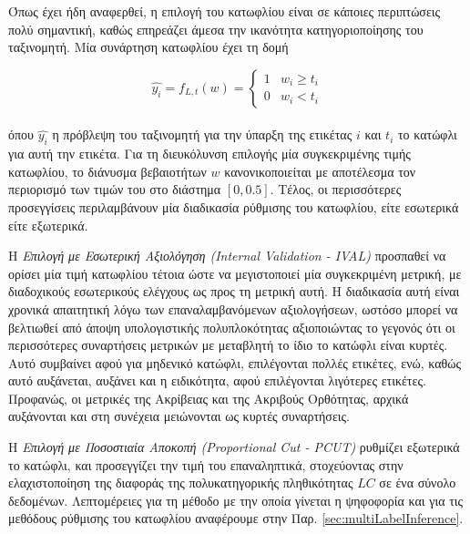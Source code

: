 Όπως έχει ήδη αναφερθεί, η επιλογή του κατωφλίου είναι σε κάποιες περιπτώσεις πολύ σημαντική, καθώς επηρεάζει άμεσα την ικανότητα κατηγοριοποίησης του ταξινομητή. Μία συνάρτηση κατωφλίου έχει τη δομή 

\begin{equation}
\hat{y_i}= f_{L,t}(w) = \left\{ \begin{matrix}1 & w_i \geq t_i \\ 0 & w_i < t_i \end{matrix}\right.                                                                                                                                        
\end{equation}  
\\
όπου $\hat{y_i}$ η πρόβλεψη του ταξινομητή για την ύπαρξη της ετικέτας $i$ και $t_i$ το κατώφλι για αυτή την ετικέτα. Για τη διευκόλυνση επιλογής μία συγκεκριμένης τιμής κατωφλίου, το διάνυσμα βεβαιοτήτων $w$ κανονικοποιείται με αποτέλεσμα τον περιορισμό των τιμών του στο διάστημα $[0, 0.5]$. Τέλος, οι περισσότερες προσεγγίσεις περιλαμβάνουν μία διαδικασία ρύθμισης του κατωφλίου, είτε εσωτερικά είτε εξωτερικά. 

Η \emph{Επιλογή με Εσωτερική Αξιολόγηση (Internal Validation - IVAL)} προσπαθεί να ορίσει μία τιμή κατωφλίου τέτοια ώστε να μεγιστοποιεί μία συγκεκριμένη μετρική, με διαδοχικούς εσωτερικούς ελέγχους ως προς τη μετρική αυτή. Η διαδικασία αυτή είναι χρονικά απαιτητική λόγω των επαναλαμβανόμενων αξιολογήσεων, ωστόσο μπορεί να βελτιωθεί από άποψη υπολογιστικής πολυπλοκότητας αξιοποιώντας το γεγονός ότι οι περισσότερες συναρτήσεις μετρικών με μεταβλητή το ίδιο το κατώφλι είναι κυρτές. Αυτό συμβαίνει αφού για μηδενικό κατώφλι, επιλέγονται πολλές ετικέτες, ενώ, καθώς αυτό αυξάνεται, αυξάνει και η ειδικότητα, αφού επιλέγονται λιγότερες ετικέτες. Προφανώς, οι μετρικές της Ακρίβειας και της Ακριβούς Ορθότητας, αρχικά αυξάνονται και στη συνέχεια μειώνονται ως κυρτές συναρτήσεις. 

Η \emph{Επιλογή με Ποσοστιαία Αποκοπή (Proportional Cut - PCUT)} ρυθμίζει εξωτερικά το κατώφλι, και προσεγγίζει την τιμή του επαναληπτικά, στοχεύοντας στην ελαχιστοποίηση της διαφοράς της πολυκατηγορικής πληθικότητας $LC$ σε ένα σύνολο δεδομένων. Λεπτομέρειες για τη μέθοδο με την οποία γίνεται η ψηφοφορία και για τις μεθόδους ρύθμισης του κατωφλίου αναφέρουμε στην Παρ. \ref{sec:multiLabelInference}.
 


